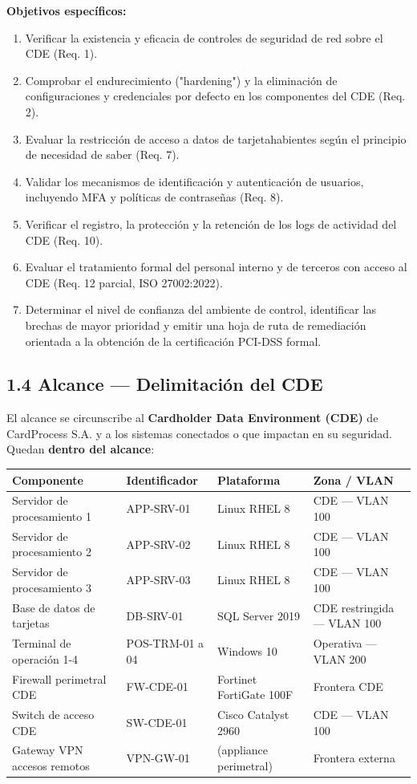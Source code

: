 \documentclass[11pt,a4paper]{article}
\begin{document}
\textbf{Objetivos específicos:}

\begin{enumerate}[leftmargin=*]
  \item Verificar la existencia y eficacia de controles de seguridad de red sobre el CDE (Req. 1).
  \item Comprobar el endurecimiento ("hardening") y la eliminación de configuraciones y credenciales por defecto en los componentes del CDE (Req. 2).
  \item Evaluar la restricción de acceso a datos de tarjetahabientes según el principio de necesidad de saber (Req. 7).
  \item Validar los mecanismos de identificación y autenticación de usuarios, incluyendo MFA y políticas de contraseñas (Req. 8).
  \item Verificar el registro, la protección y la retención de los logs de actividad del CDE (Req. 10).
  \item Evaluar el tratamiento formal del personal interno y de terceros con acceso al CDE (Req. 12 parcial, ISO 27002:2022).
  \item Determinar el nivel de confianza del ambiente de control, identificar las brechas de mayor prioridad y emitir una hoja de ruta de remediación orientada a la obtención de la certificación PCI-DSS formal.
\end{enumerate}

\subsection{1.4 Alcance — Delimitación del CDE}

El alcance se circunscribe al \textbf{Cardholder Data Environment (CDE)} de CardProcess S.A. y a los sistemas conectados o que impactan en su seguridad. Quedan \textbf{dentro del alcance}:

\begin{tabularx}{\textwidth}{P{2.5cm}P{3cm}P{2.5cm}L}
\toprule
\textbf{Componente} & \textbf{Identificador} & \textbf{Plataforma} & \textbf{Zona / VLAN} \\
\midrule
Servidor de procesamiento 1 & APP-SRV-01 & Linux RHEL 8 & CDE — VLAN 100 \\
Servidor de procesamiento 2 & APP-SRV-02 & Linux RHEL 8 & CDE — VLAN 100 \\
Servidor de procesamiento 3 & APP-SRV-03 & Linux RHEL 8 & CDE — VLAN 100 \\
Base de datos de tarjetas & DB-SRV-01 & SQL Server 2019 & CDE restringida — VLAN 100 \\
Terminal de operación 1-4 & POS-TRM-01 a 04 & Windows 10 & Operativa — VLAN 200 \\
Firewall perimetral CDE & FW-CDE-01 & Fortinet FortiGate 100F & Frontera CDE \\
Switch de acceso CDE & SW-CDE-01 & Cisco Catalyst 2960 & CDE — VLAN 100 \\
Gateway VPN accesos remotos & VPN-GW-01 & (appliance perimetral) & Frontera externa \\
\bottomrule
\end{tabularx}
\end{document}
